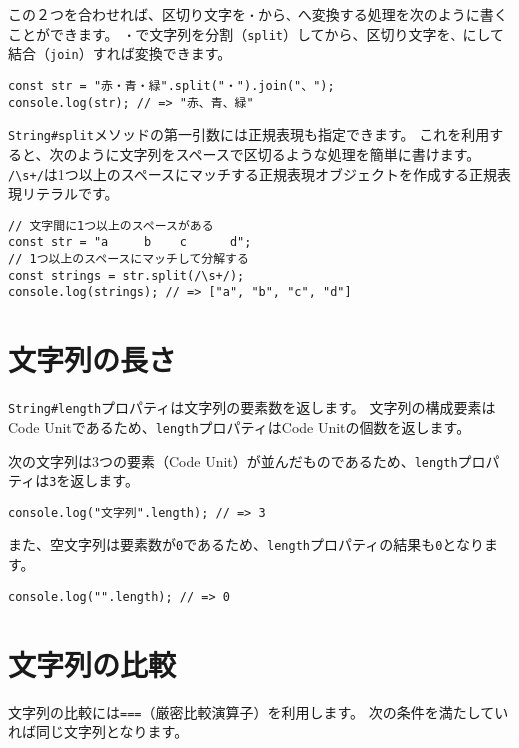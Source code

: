 この２つを合わせれば、区切り文字を\texttt{・}から\texttt{、}へ変換する処理を次のように書くことができます。
\texttt{・}で文字列を分割（\texttt{split}）してから、区切り文字を\texttt{、}にして結合（\texttt{join}）すれば変換できます。

\begin{lstlisting}
const str = "赤・青・緑".split("・").join("、");
console.log(str); // => "赤、青、緑"
\end{lstlisting}

\texttt{String\#split}メソッドの第一引数には正規表現も指定できます。
これを利用すると、次のように文字列をスペースで区切るような処理を簡単に書けます。
\texttt{/\textbackslash s+/}は1つ以上のスペースにマッチする正規表現オブジェクトを作成する正規表現リテラルです。

\begin{lstlisting}
// 文字間に1つ以上のスペースがある
const str = "a     b    c      d";
// 1つ以上のスペースにマッチして分解する
const strings = str.split(/\s+/);
console.log(strings); // => ["a", "b", "c", "d"] 
\end{lstlisting}

\hypertarget{length}{%
\section{文字列の長さ}\label{length}}

\texttt{String\#length}プロパティは文字列の要素数を返します。
文字列の構成要素はCode
Unitであるため、\texttt{length}プロパティはCode
Unitの個数を返します。

次の文字列は3つの要素（Code
Unit）が並んだものであるため、\texttt{length}プロパティは\texttt{3}を返します。

\begin{lstlisting}
console.log("文字列".length); // => 3
\end{lstlisting}

また、空文字列は要素数が\texttt{0}であるため、\texttt{length}プロパティの結果も\texttt{0}となります。

\begin{lstlisting}
console.log("".length); // => 0
\end{lstlisting}

\hypertarget{compare}{%
\section{文字列の比較}\label{compare}}

文字列の比較には\texttt{===}（厳密比較演算子）を利用します。
次の条件を満たしていれば同じ文字列となります。

